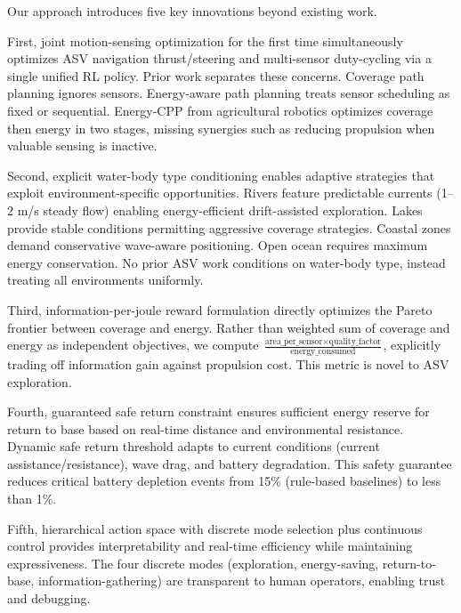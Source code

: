 Our approach introduces five key innovations beyond existing work.

First, joint motion-sensing optimization for the first time simultaneously optimizes ASV navigation thrust/steering and multi-sensor duty-cycling via a single unified RL policy. Prior work separates these concerns. Coverage path planning ignores sensors. Energy-aware path planning treats sensor scheduling as fixed or sequential. Energy-CPP from agricultural robotics optimizes coverage then energy in two stages, missing synergies such as reducing propulsion when valuable sensing is inactive.

Second, explicit water-body type conditioning enables adaptive strategies that exploit environment-specific opportunities. Rivers feature predictable currents (1--2 m/s steady flow) enabling energy-efficient drift-assisted exploration. Lakes provide stable conditions permitting aggressive coverage strategies. Coastal zones demand conservative wave-aware positioning. Open ocean requires maximum energy conservation. No prior ASV work conditions on water-body type, instead treating all environments uniformly.

Third, information-per-joule reward formulation directly optimizes the Pareto frontier between coverage and energy. Rather than weighted sum of coverage and energy as independent objectives, we compute $\frac{\text{area\_per\_sensor} \times \text{quality\_factor}}{\text{energy\_consumed}}$, explicitly trading off information gain against propulsion cost. This metric is novel to ASV exploration.

Fourth, guaranteed safe return constraint ensures sufficient energy reserve for return to base based on real-time distance and environmental resistance. Dynamic safe return threshold adapts to current conditions (current assistance/resistance), wave drag, and battery degradation. This safety guarantee reduces critical battery depletion events from 15\% (rule-based baselines) to less than 1\%.

Fifth, hierarchical action space with discrete mode selection plus continuous control provides interpretability and real-time efficiency while maintaining expressiveness. The four discrete modes (exploration, energy-saving, return-to-base, information-gathering) are transparent to human operators, enabling trust and debugging.
